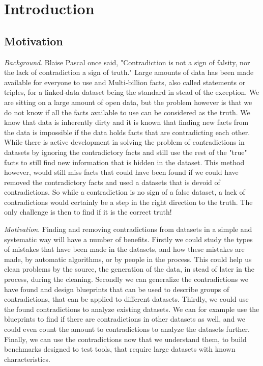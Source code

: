 \documentclass{article}
\begin{document}
\section{Introduction}
\subsection{Motivation}
\textit{Background}. Blaise Pascal once said, "Contradiction is not a sign of falsity, nor the lack of contradiction a sign of truth." Large amounts of data has been made available for everyone to use and Multi-billion facts, also called statements or triples, for a linked-data dataset being the standard in stead of the exception. We are sitting on a large amount of open data, but the problem however is that we do not know if all the facts available to use can be considered as the truth. We know that data is inherently dirty and it is known that finding new facts from the data is impossible if the data holds facts that are contradicting each other. While there is active development in solving the problem of contradictions in datasets by ignoring the contradictory facts and still use the rest of the "true" facts to still find new information that is hidden in the dataset. This method however, would still miss facts that could have been found if we could have removed the contradictory facts and used a datasets that is devoid of contradictions. So while a contradiction is no sign of a false dataset, a lack of contradictions would certainly be a step in the right direction to the truth. The only challenge is then to find if it is the correct truth!

\textit{Motivation}. Finding and removing contradictions from datasets in a simple and systematic way will have a number of benefits. Firstly we could study the types of mistakes that have been made in the datasets, and how these mistakes are made, by automatic algorithms, or by people in the process. This could help us clean problems by the source, the generation of the data, in stead of later in the process, during the cleaning. 
Secondly we can generalize the contradictions we have found and design blueprints that can be used to describe groups of contradictions, that can be applied to different datasets. 
Thirdly, we could use the found contradictions to analyze existing datasets. We can for example use the blueprints to find if there are contradictions in other datasets as well, and we could even count the amount to contradictions to analyze the datasets further. 
Finally, we can use the contradictions now that we understand them, to build benchmarks designed to test tools, that require large datasets with known characteristics.
\end{document}

